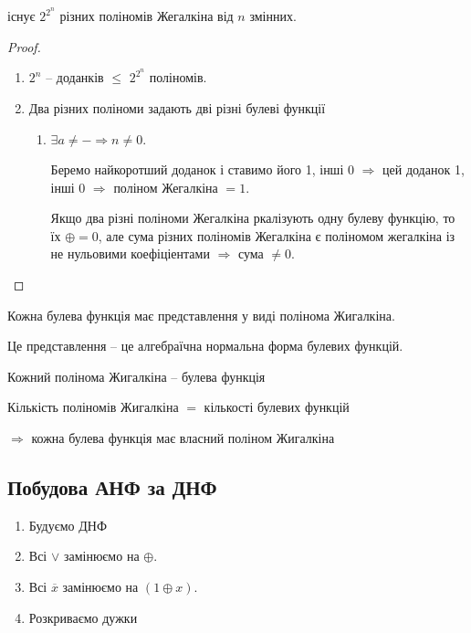 \begin{lemma}
    існує $2^{2^n}$ різних поліномів Жегалкіна від $n$ змінних.
\end{lemma}
\begin{proof}
    \begin{enumerate}
        \item $2^{n}$ -- доданків $\leqslant$ $2^{2^n}$ поліномів.
        \item Два різних поліноми задають дві різні булеві функції
        \begin{enumerate}
            \item $\exists a \neq - \Rightarrow n \neq 0$.
            
            Беремо найкоротший доданок і ставимо його 1, інші 0
            $\Rightarrow$ цей доданок 1, інші 0 
            $\Rightarrow$ поліном Жегалкіна $= 1$.
    
            Якщо два різні поліноми Жегалкіна ркалізують одну булеву функцію, то їх $\oplus = 0$, 
            але сума різних поліномів Жегалкіна є поліномом жегалкіна із не нульовими коефіціентами
            $\Rightarrow$ сума $\neq 0$.
        \end{enumerate}
    \end{enumerate}
\end{proof}

\begin{theorem}[Жегалкіна]
    Кожна булева функція має представлення у виді полінома Жигалкіна.
\end{theorem}

Це представлення -- це алгебраїчна нормальна форма булевих функцій.

Кожний полінома Жигалкіна -- булева функція

Кількість поліномів Жигалкіна $=$ кількості булевих функцій

$\Rightarrow$ кожна булева функція має власний поліном Жигалкіна

\subsection{Побудова АНФ за ДНФ}

\begin{enumerate}
    \item Будуємо ДНФ
    \item Всі $\vee$ замінюємо на $\oplus$.
    \item Всі $\overline{x}$ замінюємо на $(1 \oplus x)$.
    \item Розкриваємо дужки
\end{enumerate}

